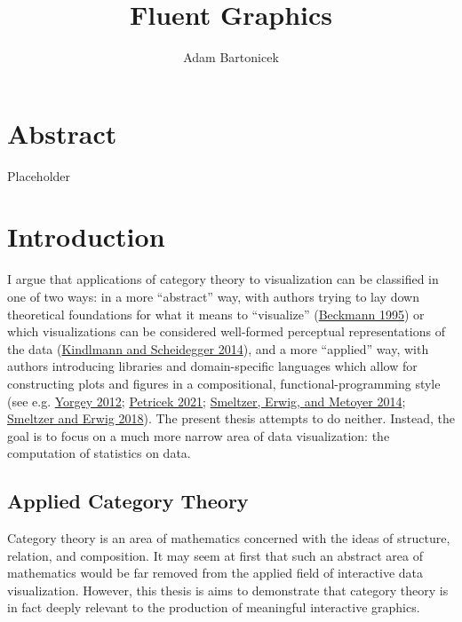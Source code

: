 \documentclass[
]{book}
\title{Fluent Graphics}
\author{Adam Bartonicek}
\date{}
\theoremstyle{definition}
\theoremstyle{definition}
\theoremstyle{definition}
\theoremstyle{definition}
\theoremstyle{remark}
\begin{document}
\maketitle

{
\setcounter{tocdepth}{1}
\tableofcontents
}
\hypertarget{abstract}{%
\chapter{Abstract}\label{abstract}}

Placeholder

\hypertarget{introduction}{%
\chapter{Introduction}\label{introduction}}

I argue that applications of category theory to visualization can be classified in one of two ways: in a more ``abstract'' way, with authors trying to lay down theoretical foundations for what it means to ``visualize'' (\protect\hyperlink{ref-beckmann1995}{Beckmann 1995}) or which visualizations can be considered well-formed perceptual representations of the data (\protect\hyperlink{ref-kindlmann2014}{Kindlmann and Scheidegger 2014}), and a more ``applied'' way, with authors introducing libraries and domain-specific languages which allow for constructing plots and figures in a compositional, functional-programming style (see e.g. \protect\hyperlink{ref-yorgey2012}{Yorgey 2012}; \protect\hyperlink{ref-petricek2021}{Petricek 2021}; \protect\hyperlink{ref-smeltzer2014}{Smeltzer, Erwig, and Metoyer 2014}; \protect\hyperlink{ref-smeltzer2018}{Smeltzer and Erwig 2018}). The present thesis attempts to do neither. Instead, the goal is to focus on a much more narrow area of data visualization: the computation of statistics on data.

\hypertarget{applied-category-theory}{%
\section{Applied Category Theory}\label{applied-category-theory}}

Category theory is an area of mathematics concerned with the ideas of structure, relation, and composition. It may seem at first that such an abstract area of mathematics would be far removed from the applied field of interactive data visualization. However, this thesis is aims to demonstrate that category theory is in fact deeply relevant to the production of meaningful interactive graphics.
\end{document}
